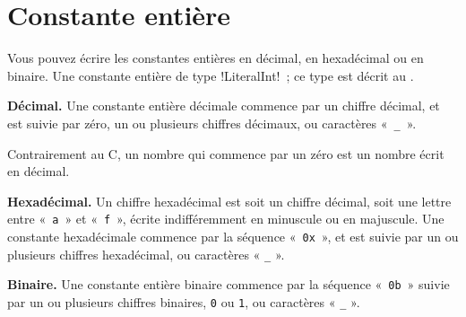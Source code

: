 %
%
%



\section{Constante entière}

Vous pouvez écrire les constantes entières en décimal, en hexadécimal ou en binaire. Une constante entière de type \omnibus!LiteralInt!~; ce type est décrit au .

\textbf{Décimal.} Une constante entière décimale commence par un chiffre décimal, et est suivie par zéro, un ou plusieurs chiffres décimaux, ou caractères «~\texttt{\_}~».

Contrairement au C, un nombre qui commence par un zéro est un nombre écrit en décimal.

\textbf{Hexadécimal.} Un chiffre hexadécimal est soit un chiffre décimal, soit une lettre entre «~\texttt{a}~» et «~\texttt{f}~», écrite indifféremment en minuscule ou en majuscule. Une constante hexadécimale commence par la séquence «~\texttt{0x}~», et est suivie par un ou plusieurs chiffres hexadécimal, ou caractères « \texttt{\_} ».

\textbf{Binaire.} Une constante entière binaire commence par la séquence «~\texttt{0b}~» suivie par un ou plusieurs chiffres binaires, \texttt{0} ou \texttt{1}, ou caractères « \texttt{\_} ».

